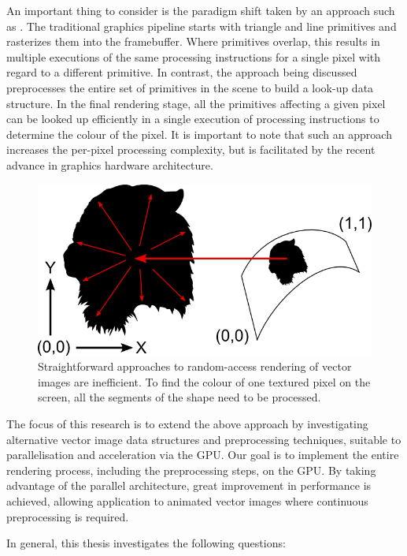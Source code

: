 \documentclass[11pt,a4paper,twoside]{article}
\begin{document}
An important thing to consider is the paradigm shift taken by an approach such as \cite{NehabHoppe08}. The traditional graphics pipeline starts with triangle and line primitives and rasterizes them into the framebuffer. Where primitives overlap, this results in multiple executions of the same processing instructions for a single pixel with regard to a different primitive. In contrast, the approach being discussed preprocesses the entire set of primitives in the scene to build a look-up data structure. In the final rendering stage, all the primitives affecting a given pixel can be looked up efficiently in a single execution of processing instructions to determine the colour of the pixel. It is important to note that such an approach increases the per-pixel processing complexity, but is facilitated by the recent advance in graphics hardware architecture.

\begin {figure}
	\centering
	\includegraphics[width=0.60\columnwidth] {figures/random_access_vector}
	\caption {Straightforward approaches to random-access rendering of vector images are inefficient. To find the colour of one textured pixel on the screen, all the segments of the shape need to be processed.}
	\label {fig:random_access_vector}
\end {figure}

The focus of this research is to extend the above approach by investigating alternative vector image data structures and preprocessing techniques, suitable to parallelisation and acceleration via the GPU. Our goal is to implement the entire rendering process, including the preprocessing steps, on the GPU. By taking advantage of the parallel architecture, great improvement in performance is achieved, allowing application to animated vector images where continuous preprocessing is required.

In general, this thesis investigates the following questions:
\end{document}
